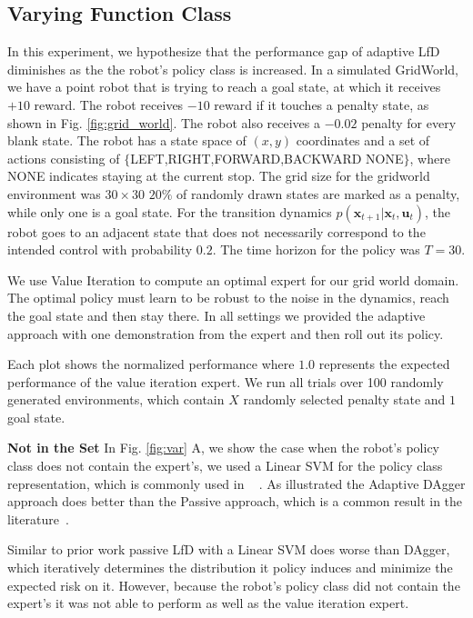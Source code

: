 \documentclass[10pt, conference]{ieeeconf}      %
\newcommand{\bu}{\mathbf{u}}
\newcommand{\bx}{\mathbf{x}}
\begin{document}
\subsection{Varying Function Class}\label{sec:gdw}
In this experiment, we hypothesize that the performance gap of adaptive LfD diminishes as the the robot's policy class is increased. In a simulated GridWorld, we have a point robot that is trying to reach a goal state, at which it receives $+10$ reward. The robot receives $-10$ reward if it touches a penalty state, as shown in Fig. \ref{fig:grid_world}. The robot also receives a $-0.02$ penalty for every blank state. The robot has a state space of $(x,y)$ coordinates and a set of actions consisting of $\lbrace$LEFT,RIGHT,FORWARD,BACKWARD NONE$\rbrace$, where NONE indicates staying at the current stop. The grid size for the gridworld environment was $30 \times 30$ $20\%$ of randomly drawn states are marked as a penalty, while only one is a goal state. For the transition dynamics $p(\bx_{t+1}|\bx_{t},\bu_t)$, the robot goes to an adjacent state that does not necessarily correspond to the intended control with probability $0.2$.  The time horizon for the policy was $T=30$. 

We use Value Iteration to compute an optimal expert for our grid world domain. The optimal policy must learn to be robust to the noise in the dynamics, reach the goal state and then stay there. In all settings we provided the adaptive approach with one demonstration from the expert and then roll out its policy. 

Each plot shows the normalized performance where $1.0$ represents the expected performance of the value iteration expert. We run all trials over 100 randomly generated environments, which contain $X$ randomly selected penalty state and $1$ goal state. 


\noindent \textbf{Not in the Set} In Fig. \ref{fig:var} A, we show the case when the robot's policy class does not contain the expert's, we used a Linear SVM for the policy class representation, which is commonly used in ~\cite{ross2010efficient,ross2010reduction,ross2013learning} . As illustrated the Adaptive DAgger approach does better than the Passive approach, which is a common result in the literature~\cite{ross2010efficient,ross2010reduction}.


Similar to prior work passive LfD  with a Linear SVM does worse than DAgger, which iteratively determines the distribution it policy induces and minimize the expected risk on it. However, because the robot's policy class did not contain the expert's it was not able to perform as well as the value iteration expert. 
\end{document}
